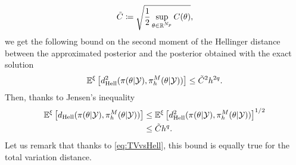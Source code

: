 \begin{equation}
	\tilde C \coloneqq \sqrt{\frac{1}{2} \sup_{\theta \in \mathbb{R}^{N_p}} C(\theta)}, 
\end{equation}
we get the following bound on the second moment of the Hellinger distance between the approximated posterior and the posterior obtained with the exact solution 
\begin{equation}
	\mathbb{E}^\xi\left[d_{\mathrm{Hell}}^2(\pi(\theta|\mathcal{Y}),\pi^M_h(\theta|\mathcal{Y}))\right] \leq \tilde C^2 h^{2q}.
\end{equation}
Then, thanks to Jensen's inequality
\begin{equation}
\begin{aligned}
	\mathbb{E}^\xi\left[d_{\mathrm{Hell}}(\pi(\theta|\mathcal{Y}),\pi^M_h(\theta|\mathcal{Y}))\right] &\leq \mathbb{E}^\xi\left[d_{\mathrm{Hell}}^2(\pi(\theta|\mathcal{Y}),\pi^M_h(\theta|\mathcal{Y}))\right]^{1/2} \\
	&\leq \tilde C h^q.
\end{aligned}
\end{equation}
Let us remark that thanks to \eqref{eq:TVvsHell}, this bound is equally true for the total variation distance. 

